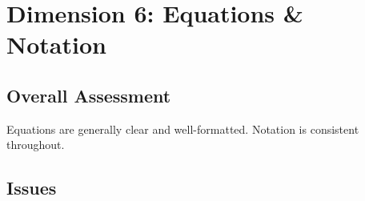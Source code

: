 \documentclass[12pt,a4paper]{article}
\begin{document}
\section{Dimension 6: Equations \& Notation}

\subsection*{Overall Assessment}
Equations are generally clear and well-formatted. Notation is consistent throughout.

\subsection*{Issues}
\end{document}
